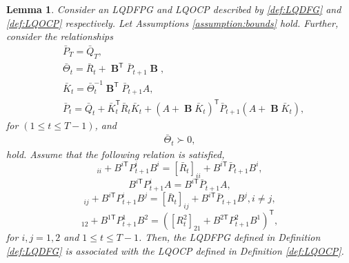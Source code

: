 \documentclass[letterpaper, 10 pt, conference]{ieeeconf}  %
\newcommand{\transpose}{\mathsf{T}}
\DeclareMathOperator{\contB}{\mathbf{B}}
\newtheorem{lemma}{Lemma}
\begin{document}
\begin{lemma}\label{lemma:gamePGrelation}
    Consider an LQDFPG and LQOCP described by \ref{def:LQDFG} and \ref{def:LQOCP} respectively. Let Assumptions \ref{assumption:bounds} hold. Further, consider the relationships
    \begin{align*}
        &\bar{P}_{T} = \bar{Q}_{T},\\
        &\bar{\Theta}_{t} = \bar{R}_{t} + \contB^{\transpose}\bar{P}_{t+1}\contB,\\
        &\bar{K}_{t} = \bar{\Theta}_{t}^{-1}\contB^{\transpose}\bar{P}_{t+1}A,\\
        &\bar{P}_{t} = \bar{Q}_{t} + \bar{K}_{t}^{\transpose}\bar{R}_{t}\bar{K}_{t} + (A+\contB\bar{K}_{t})^{\transpose}\bar{P}_{t+1}(A+\contB\bar{K}_{t}),
    \end{align*}
    for $(1\leq t \leq T-1)$,
    and
    \begin{align*}
        \bar{\Theta}_{t} \succ 0,
    \end{align*}
    hold.
    Assume that the following relation is satisfied,
    \begin{equation}
        [R_{t}^{i}]_{ii} + B^{i\transpose}P_{t+1}^{i}B^{i} = [\bar{R}_{t}]_{ii} + B^{i\transpose}\bar{P}_{t+1}B^{i},
    \end{equation}
    \begin{equation}
        B^{i\transpose}P_{t+1}^{i}A = B^{i\transpose}\bar{P}_{t+1}A,
    \end{equation}
    \begin{equation}
        [R_{t}^{i}]_{ij} + B^{i\transpose}P_{t+1}^{i}B^{j} = [\bar{R}_{t}]_{ij} + B^{i\transpose}\bar{P}_{t+1}B^{j},i\neq j,
    \end{equation}
    \begin{equation}
        [R_{t}^{1}]_{12} + B^{1\transpose}P_{t+1}^{1}B^{2} = ([R^{2}_{t}]_{21} + B^{2\transpose}P^{2}_{t+1}B^{1})^{\transpose},
    \end{equation}
    for $i,j=1,2$ and $1\leq t \leq T-1$. Then, the LQDFPG defined in Definition \ref{def:LQDFG} is associated with the LQOCP defined in Definition \ref{def:LQOCP}.
\end{lemma}
\end{document}
